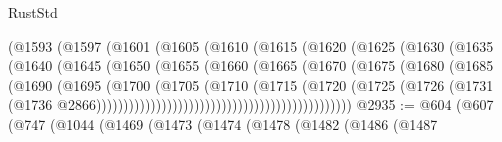 \begin{lexlean}{RustStd}
\begin{coremodule}
{\begin{coremodule}
{{{{{{{{{{{{{{{{{{{{{{{{{{{{{{{{{{{{{{{{{{{{{                                    (@1593
                                      (@1597
                                        (@1601
                                          (@1605
                                            (@1610
                                              (@1615
                                                (@1620
                                                  (@1625
                                                    (@1630
                                                      (@1635
                                                        (@1640
                                                          (@1645
                                                            (@1650
                                                              (@1655
                                                                (@1660
                                                                  (@1665
                                                                    (@1670
                                                                      (@1675
                                                                        (@1680
                                                                          (@1685
                                                                            (@1690
                                                                              (@1695
                                                                                (@1700
                                                                                  (@1705
                                                                                    (@1710
                                                                                      (@1715
                                                                                        (@1720
                                                                                          (@1725
                                                                                            (@1726
                                                                                              (@1731
                                                                                                (@1736
                                                                                                  @2866)))))))))))))))))))))))))))))))))))))))))))))))
@2935 := @604
    (@607
      (@747
        (@1044
          (@1469
            (@1473
              (@1474
                (@1478
                  (@1482
                    (@1486
                      (@1487
}}}}}}}}}}}}}}}}}}}}}}}}}}}}}}}}}}}}}}}}}}}}}
\end{coremodule}}
\end{coremodule}
\end{lexlean}
